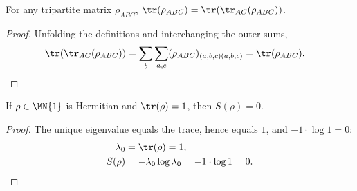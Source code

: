 \begin{theorem}
    \label{thm:trace_traceac_abc}
    \leanok
    For any tripartite matrix $\rho_{ABC}$,
    $\tr(\rho_{ABC})=\tr(\tr_{AC}(\rho_{ABC}))$.
\end{theorem}

\begin{proof}\leanok
    Unfolding the definitions and interchanging the outer sums,
    \begin{align}
        \tr(\tr_{AC}(\rho_{ABC}))
        &= \sum_b\sum_{a,c}
        (\rho_{ABC})_{(a,b,c)(a,b,c)}
        = \tr(\rho_{ABC}).
        \notag
    \end{align}
\end{proof}


\begin{theorem}
    \label{thm:entropy_fin_one_zero}
    \leanok
    If $\rho\in\MN{1}$ is Hermitian and $\tr(\rho)=1$, then
    $S(\rho)=0$.
\end{theorem}

\begin{proof}\leanok
    The unique eigenvalue equals the trace, hence equals $1$, and
    $-1\cdot\log 1=0$:
    \begin{align}
        \lambda_0 &= \tr(\rho)=1,
        \notag\\
        S(\rho) &= -\lambda_0\log\lambda_0
        =-1\cdot\log 1=0.
        \notag
    \end{align}
\end{proof}
